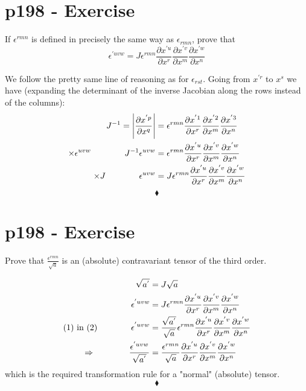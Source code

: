 \section{p198 - Exercise}
\begin{tcolorbox}
If $\epsilon^{rmn}$ is defined in precisely the same way as $\epsilon_{rmn}$, prove that $$ \epsilon^{'uvw}= J\epsilon^{rmn}\frac{\partial x^{'u}}{\partial x^r}\frac{\partial x^{'v}}{\partial x^m}\frac{\partial x^{'w}}{\partial x^n}$$
\end{tcolorbox}
We follow the pretty same line of reasoning as for $\epsilon_{rst}$. Going from $x^{'r}$ to $x^{s}$ we have (expanding the determinant of the inverse Jacobian along the rows instead of the columns):
\begin{align}
J^{-1}=\left|\frac{\partial x^{'p}}{\partial x^{q}}\right|&= \epsilon^{rmn}\frac{\partial x^{'1}}{\partial x^r}\frac{\partial x^{'2}}{\partial x^m}\frac{\partial x^{'3}}{\partial x^n}\\
\times \epsilon^{uvw}\quad\quad\quad\quad J^{-1}\epsilon^{uvw}&= \epsilon^{rmn}\frac{\partial x^{'u}}{\partial x^r}\frac{\partial x^{'v}}{\partial x^m}\frac{\partial x^{'w}}{\partial x^n}\\
\times J\quad\quad\quad\quad\epsilon^{uvw}&= J\epsilon^{rmn}\frac{\partial x^{'u}}{\partial x^r}\frac{\partial x^{'v}}{\partial x^m}\frac{\partial x^{'w}}{\partial x^n}\\ 
\end{align}
 $$\blacklozenge$$
\newpage



\section{p198 - Exercise}
\begin{tcolorbox}
Prove that  $\frac{\epsilon^{rmn}}{\sqrt{a}}$ is an (absolute) contravariant tensor of the third order.
\end{tcolorbox}
\begin{align} 
\sqrt{a^{'}} &= J\sqrt{a}\\
\epsilon^{'uvw}&= J\epsilon^{rmn}\frac{\partial x^{'u}}{\partial x^r}\frac{\partial x^{'v}}{\partial x^m}\frac{\partial x^{'w}}{\partial x^n}\\
\text{(1)  in (2)} \quad\quad\quad\quad \epsilon^{'uvw}&= \frac{\sqrt{a^{'}}}{\sqrt{a^{}}}\epsilon^{rmn}\frac{\partial x^{'u}}{\partial x^r}\frac{\partial x^{'v}}{\partial x^m}\frac{\partial x^{'w}}{\partial x^n}\\
\Rightarrow \quad\quad\quad\quad \frac{\epsilon^{'uvw}}{\sqrt{a^{'}}}&= \frac{\epsilon^{rmn}}{\sqrt{a}}\frac{\partial x^{'u}}{\partial x^r}\frac{\partial x^{'v}}{\partial x^m}\frac{\partial x^{'w}}{\partial x^n}
\end{align}
which is the required transformation rule for a "normal" (absolute) tensor.
 $$\blacklozenge$$
\newpage


